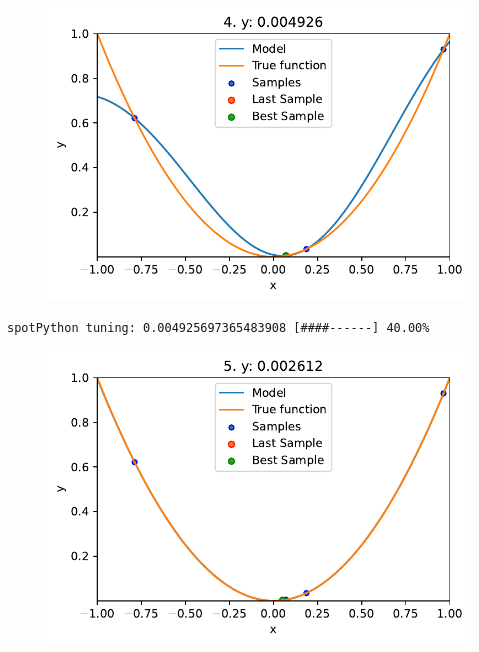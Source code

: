 \documentclass[
  letterpaper,
  DIV=11,
  numbers=noendperiod]{scrreprt}
\begin{document}
\begin{figure}[H]

{\centering \includegraphics{010_num_spot_sklearn_surrogate_files/figure-pdf/cell-25-output-2.pdf}

}

\end{figure}

\begin{verbatim}
spotPython tuning: 0.004925697365483908 [####------] 40.00% 
\end{verbatim}

\begin{figure}[H]

{\centering \includegraphics{010_num_spot_sklearn_surrogate_files/figure-pdf/cell-25-output-4.pdf}

}

\end{figure}
\end{document}
